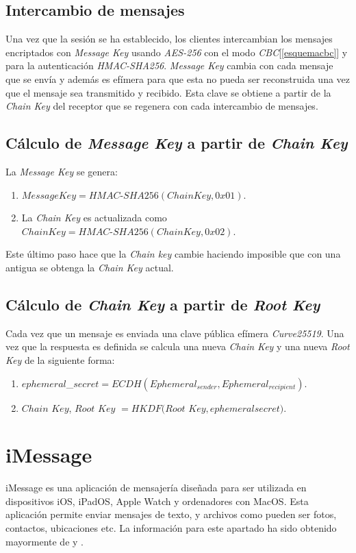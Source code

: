 \subsection{Intercambio de mensajes}
Una vez que la sesión se ha establecido, los clientes intercambian los mensajes encriptados con \emph{Message Key} usando \emph{AES-256} con el modo \emph{CBC}[\ref{esquemacbc}] y para la autenticación \emph{HMAC-SHA256}. \emph{Message Key} cambia con cada mensaje que se envía y además es efímera para que esta no pueda ser reconstruida una vez que el mensaje sea transmitido y recibido. Esta clave se obtiene a partir de la \emph{Chain Key} del receptor que se regenera con cada intercambio de mensajes. 

\subsection{Cálculo de \emph{Message Key} a partir de \emph{Chain Key}}
La \emph{Message Key} se genera:
\begin{enumerate}
	\item $Message Key = HMAC$-$SHA256(Chain Key, 0x01)$.
	\item La \emph{Chain Key} es actualizada como \\ $Chain Key = HMAC$-$SHA256(Chain Key, 0x02)$.
\end{enumerate}
Este último paso hace que la \emph{Chain key} cambie haciendo imposible que con una  antigua se obtenga la \emph{Chain Key} actual.

\subsection{Cálculo de \emph{Chain Key} a partir de \emph{Root Key}}
Cada vez que un mensaje es enviada una clave pública efímera \emph{Curve25519}. Una vez que la respuesta es definida se calcula una nueva \emph{Chain Key} y una nueva \emph{Root Key} de la siguiente forma:
\begin{enumerate}
	\item $ephemeral$\_$secret = ECDH(Ephemeral_{sender}, Ephemeral_{recipient})$.
	\item $Chain$ $Key$, $Root$ $Key$ $= HKDF(Root$ $Key, ephemeral$\textunderscore$secret)$.
\end{enumerate}

\section{iMessage}
iMessage es una aplicación de mensajería diseñada para ser utilizada en dispositivos iOS, iPadOS, Apple Watch y ordenadores con MacOS. Esta aplicación permite enviar mensajes de texto, y archivos como pueden ser fotos, contactos, ubicaciones etc. La información para este apartado ha sido obtenido mayormente de \cite{apple2} y \cite{apple1}.\\

